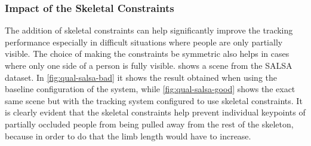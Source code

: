 \subsubsection{Impact of the Skeletal Constraints}

The addition of skeletal constraints can help significantly improve the tracking performance especially in difficult situations where people are only partially visible. The choice of making the constraints be symmetric also helps in cases where only one side of a person is fully visible.  shows a scene from the SALSA dataset. In \cref{fig:qual-salsa-bad} it shows the result obtained when using the baseline configuration of the system, while \cref{fig:qual-salsa-good} shows the exact same scene but with the tracking system configured to use skeletal constraints. It is clearly evident that the skeletal constraints help prevent individual keypoints of partially occluded people from being pulled away from the rest of the skeleton, because in order to do that the limb length would have to increase.

